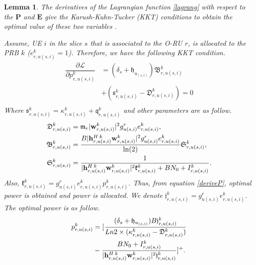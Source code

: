 \documentclass[conference]{IEEEtran}
\newtheorem{lemma}{Lemma}
\begin{document}
\begin{lemma}

The derivatives of the Lagrangian function \eqref{lagrang} with respect to the $\boldsymbol{P}$ and $\boldsymbol{E}$ give the Karush-Kuhn-Tucker (KKT) conditions to obtain the optimal value of these two variables \cite{lee2018dynamic,ali2018joint}.

Assume, UE $i$ in the slice $s$ that is associated to the O-RU $r$, is allocated to the PRB $k$  ($e_{r,u(s,i)}^{k} = 1$). Therefore, we have the following KKT condition. 
\begin{equation}\label{deriveP}
\begin{split}
\dfrac{\partial\mathcal{L}}{\partial p_{r,u(s,i)}^{k}} &= (\delta_s + \mathfrak{h}_{u_{(s,i)}})\mathfrak{B}_{r,u(s,i)}^{k}\\
 &+ (\mathfrak{s}^k_{r,u(s,i)} -\mathfrak{D}_{r,u(s,i)}^{k})=0\\
\end{split}
\end{equation}
Where $ \mathfrak{s}^k_{r,u(s,i)}=\kappa^k_{r,u(s,i)}+\mathfrak{q}^k_{r,u(s,i)}$ and other parameters are as follow.
\begin{equation}
\begin{split}
\mathfrak{D}_{r,u(s,i)}^{k} &= \mathfrak{m}_{r}|\bold{w}_{r,u(s,i)}^{k}|^2 g_{u(s,i)}^r e^k_{r,u(s,i)}, \\
\mathfrak{B}_{r,u(s,i)}^{k} &= \frac{B |{\bold{h}_{r,u(s,i)}^{H \: k}} \bold{w}_{r,u(s,i)}^{k}|^2 g_{u(s,i)}^r e_{r,u(s,i)}^{k}}{\ln(2)} \mathfrak{S}_{r,u(s,i)}^{k},\\
\mathfrak{S}_{r,u(s,i)}^{k} &= \frac{1}{{|\bold{h}_{r,u(s,i)}^{H \: k}} \bold{w}_{r,u(s,i)}^{k}|^2 \mathfrak{k}_{r,u(s,i)}^{k}+BN_0 + I_{r,u(s,i)}^{k}}.\\
\end{split}
\end{equation}
Also, $\mathfrak{k}_{r,u(s,i)}^{k} = g_{u(s,i)}^r e_{r,u(s,i)}^{k}p_{r,u(s,i)}^{k}$.
Thus, from equation \eqref{deriveP}, optimal power is obtained and power is allocated.
We denote $ \mathfrak{j}_{r,u(s,i)}^{k} = g_{u(s,i)}^r e_{r,u(s,i)}^{k}$.
The optimal power is as follow.
\begin{equation}
\begin{split}
p_{r,u(s,i)}^{k} &= [\frac{(\delta_s + \mathfrak{h}_{u_{(s,i)}})B \mathfrak{j}_{r,u(s,i)}^{k}}{ Ln2 \times (\kappa^k_{r,u(s,i)} -\mathfrak{D}_{r,u(s,i)}^{k})}\\
 &-\frac{BN_0 + I_{r,u(s,i)}^{k}}{{|\bold{h}_{r,u(s,i)}^{H \: k}} \bold{w}_{r,u(s,i)}^{k}|^2\mathfrak{j}_{r,u(s,i)}^{k}}]^+.\\

\end{split}
\end{equation}
\end{lemma}
\end{document}
